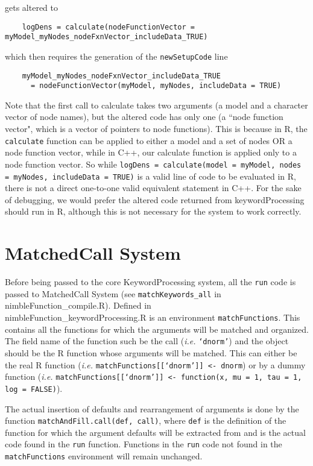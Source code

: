 \documentclass[11pt]{article}
\numberwithin{equation}{section}
\begin{document}
	gets altered to
	
	\begin{verbatim}
	logDens = calculate(nodeFunctionVector = myModel_myNodes_nodeFxnVector_includeData_TRUE)
	\end{verbatim}
	
	which then requires the generation of the \texttt{newSetupCode} line
 
 	\begin{verbatim}
	myModel_myNodes_nodeFxnVector_includeData_TRUE 
	  = nodeFunctionVector(myModel, myNodes, includeData = TRUE)
	\end{verbatim}

 	Note that the first call to calculate takes two arguments (a model and a character vector of node names), but the altered code has only one (a ``node function vector", which is a vector of pointers to node functions). This is because in R, the \texttt{calculate} function can be applied to either a model and a set of nodes OR a node function vector, while in C++, our calculate function is applied only to a node function vector. So while \texttt{logDens = calculate(model = myModel, nodes = myNodes, includeData = TRUE)} is a valid line of code to be evaluated in R, there is not a direct one-to-one valid equivalent statement in C++. For the sake of debugging, we would prefer the altered code returned from keywordProcessing should run in R, although this is not necessary for the system to work correctly. 
	
 
 	\section{MatchedCall System}
 
 	Before being passed to the core KeywordProcessing system, all the \texttt{run} code is passed to MatchedCall System (see \texttt{matchKeywords\_all} in nimbleFunction\_compile.R). Defined in \\ nimbleFunction\_keywordProcessing.R is an environment \texttt{matchFunctions}. This contains all the functions for which the arguments will be matched and organized. The field name of the function such be the call (\emph{i.e.} \texttt{`dnorm'}) and the object should be the R function whose arguments will be matched. This can either be the real R function (\emph{i.e.} \texttt{matchFunctions[[`dnorm']] <- dnorm}) or by a dummy function (\emph{i.e.} \texttt{matchFunctions[[`dnorm']] <- function(x, mu = 1, tau = 1, log = FALSE)}). 
	
	The actual insertion of defaults and rearrangement of arguments is done by the function \texttt{matchAndFill.call(def, call)}, where \texttt{def} is the definition of the function for which the argument defaults will be extracted from and  is the actual code found in the \texttt{run} function. Functions in the \texttt{run} code not found in the \texttt{matchFunctions} environment will remain unchanged. 
 
\end{document}
